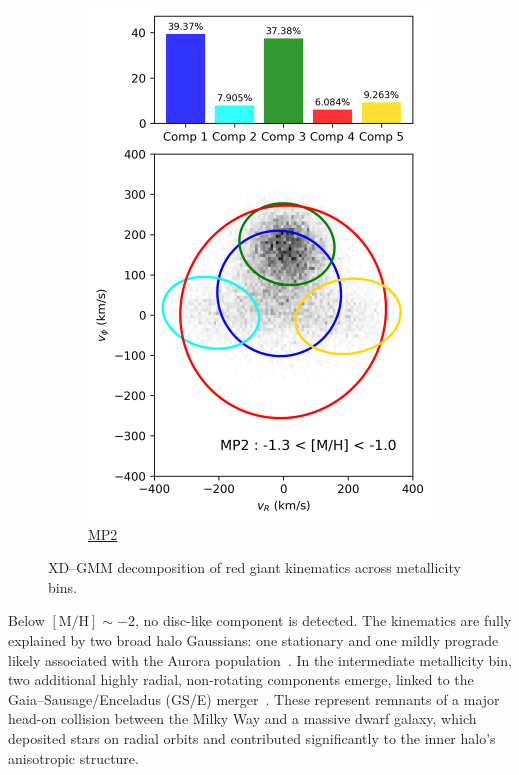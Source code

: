 \documentclass[a4paper,10pt]{article}
\begin{document}
\begin{multicols}{2}
\begin{figure}[H]
\begin{subfigure}[t]{0.24\linewidth}
    \includegraphics[width=\linewidth]{../figures/gmm_MP2.png}
    \caption{\href{https://raw.githack.com/raunaq-rai/Disentangling-the-Milky-Way-using-GMM/main/figures/MP2\_\_-1.3\%5BM\_H\%5D-1.0.html}{MP2}}
    \label{fig:gmm_mp2}
  \end{subfigure}

  \caption{XD–GMM decomposition of red giant kinematics across metallicity bins.}
  \label{fig:gmm_zhang}
\end{figure}


Below $\mathrm{[M/H]} \sim -2$, no disc-like component is detected. The kinematics are fully 
explained by two broad halo Gaussians: one stationary and one mildly prograde likely associated 
with the Aurora population~\cite{Belokurov2022}. In the intermediate metallicity bin, two 
additional highly radial, non-rotating components emerge, linked to the 
Gaia–Sausage/Enceladus (GS/E) merger~\cite{Belokurov2018}. These represent remnants of a 
major head-on collision between the Milky Way and a massive dwarf galaxy, which deposited stars 
on radial orbits and contributed significantly to the inner halo's anisotropic structure.


\end{multicols}
\end{document}
